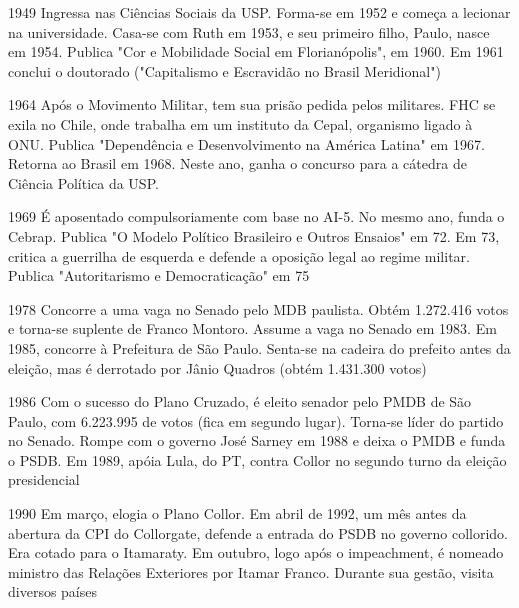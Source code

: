 1949
Ingressa nas Ciências Sociais da USP. Forma-se em 1952 e começa a lecionar na universidade. Casa-se com Ruth em 1953, e seu primeiro filho, Paulo, nasce em 1954. Publica "Cor e Mobilidade Social em Florianópolis", em 1960. Em 1961 conclui o doutorado ("Capitalismo e Escravidão no Brasil Meridional")

1964
Após o Movimento Militar, tem sua prisão pedida pelos militares. FHC se exila  no Chile, onde trabalha em um instituto da Cepal, organismo ligado à ONU. Publica "Dependência e Desenvolvimento na América Latina" em 1967. Retorna  ao Brasil em 1968.  Neste ano,  ganha o concurso para a cátedra de Ciência Política da USP.

1969
É aposentado compulsoriamente com base no AI-5. No mesmo ano, funda o Cebrap. Publica "O Modelo Político Brasileiro e Outros Ensaios" em 72. Em 73, critica a guerrilha de esquerda e defende a oposição legal ao regime militar. Publica "Autoritarismo e Democraticação" em 75

1978
Concorre a uma vaga  no  Senado pelo MDB paulista. Obtém 1.272.416 votos e torna-se suplente de Franco Montoro. Assume a vaga no Senado em 1983. Em 1985, concorre à Prefeitura de São Paulo. Senta-se na cadeira do prefeito antes da eleição, mas é derrotado por Jânio Quadros (obtém 1.431.300 votos)

1986
Com o sucesso do Plano Cruzado, é eleito senador pelo PMDB de São Paulo, com 6.223.995 de votos (fica em segundo lugar). Torna-se líder do partido  no Senado. Rompe com o governo José Sarney em 1988 e deixa o PMDB e funda o PSDB. Em 1989, apóia Lula, do PT, contra Collor no segundo turno da eleição presidencial

1990
Em março, elogia o Plano Collor. Em abril de 1992, um mês antes da abertura da CPI do Collorgate, defende a entrada do PSDB no governo collorido.  Era cotado para o Itamaraty. Em outubro, logo após o impeachment, é nomeado ministro das Relações Exteriores por Itamar Franco.  Durante sua gestão, visita diversos países

